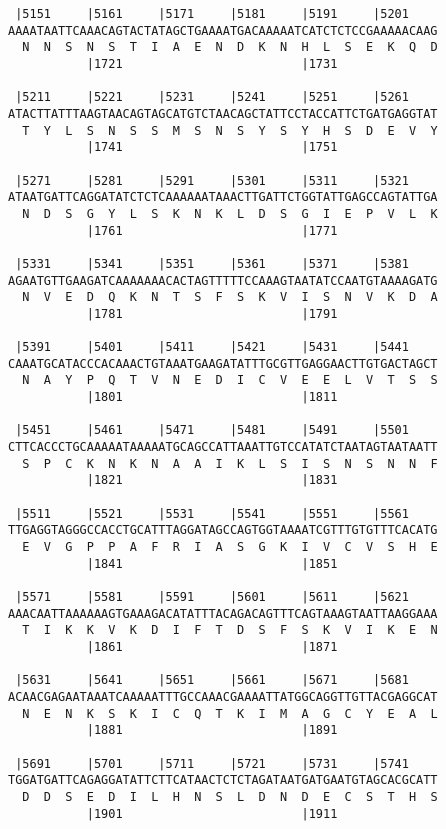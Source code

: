 \documentclass{article}
\begin{document}
\begin{Verbatim}
 |5151     |5161     |5171     |5181     |5191     |5201    
AAAATAATTCAAACAGTACTATAGCTGAAAATGACAAAAATCATCTCTCCGAAAAACAAG
  N  N  S  N  S  T  I  A  E  N  D  K  N  H  L  S  E  K  Q  D
           |1721                         |1731              
  
 |5211     |5221     |5231     |5241     |5251     |5261    
ATACTTATTTAAGTAACAGTAGCATGTCTAACAGCTATTCCTACCATTCTGATGAGGTAT
  T  Y  L  S  N  S  S  M  S  N  S  Y  S  Y  H  S  D  E  V  Y
           |1741                         |1751              
  
 |5271     |5281     |5291     |5301     |5311     |5321    
ATAATGATTCAGGATATCTCTCAAAAAATAAACTTGATTCTGGTATTGAGCCAGTATTGA
  N  D  S  G  Y  L  S  K  N  K  L  D  S  G  I  E  P  V  L  K
           |1761                         |1771              
  
 |5331     |5341     |5351     |5361     |5371     |5381    
AGAATGTTGAAGATCAAAAAAACACTAGTTTTTCCAAAGTAATATCCAATGTAAAAGATG
  N  V  E  D  Q  K  N  T  S  F  S  K  V  I  S  N  V  K  D  A
           |1781                         |1791              
  
 |5391     |5401     |5411     |5421     |5431     |5441    
CAAATGCATACCCACAAACTGTAAATGAAGATATTTGCGTTGAGGAACTTGTGACTAGCT
  N  A  Y  P  Q  T  V  N  E  D  I  C  V  E  E  L  V  T  S  S
           |1801                         |1811              
  
 |5451     |5461     |5471     |5481     |5491     |5501    
CTTCACCCTGCAAAAATAAAAATGCAGCCATTAAATTGTCCATATCTAATAGTAATAATT
  S  P  C  K  N  K  N  A  A  I  K  L  S  I  S  N  S  N  N  F
           |1821                         |1831              
  
 |5511     |5521     |5531     |5541     |5551     |5561    
TTGAGGTAGGGCCACCTGCATTTAGGATAGCCAGTGGTAAAATCGTTTGTGTTTCACATG
  E  V  G  P  P  A  F  R  I  A  S  G  K  I  V  C  V  S  H  E
           |1841                         |1851              
  
 |5571     |5581     |5591     |5601     |5611     |5621    
AAACAATTAAAAAAGTGAAAGACATATTTACAGACAGTTTCAGTAAAGTAATTAAGGAAA
  T  I  K  K  V  K  D  I  F  T  D  S  F  S  K  V  I  K  E  N
           |1861                         |1871              
  
 |5631     |5641     |5651     |5661     |5671     |5681    
ACAACGAGAATAAATCAAAAATTTGCCAAACGAAAATTATGGCAGGTTGTTACGAGGCAT
  N  E  N  K  S  K  I  C  Q  T  K  I  M  A  G  C  Y  E  A  L
           |1881                         |1891              
  
 |5691     |5701     |5711     |5721     |5731     |5741    
TGGATGATTCAGAGGATATTCTTCATAACTCTCTAGATAATGATGAATGTAGCACGCATT
  D  D  S  E  D  I  L  H  N  S  L  D  N  D  E  C  S  T  H  S
           |1901                         |1911              
  

\end{Verbatim}
\end{document}
